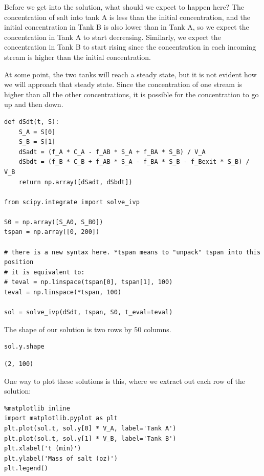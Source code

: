 \documentclass[11pt]{article}
\begin{document}
Before we get into the solution, what should we expect to happen here? The concentration of salt into tank A is less than the initial concentration, and the initial concentration in Tank B is also lower than in Tank A, so we expect the concentration in Tank A to start decreasing. Similarly, we expect the concentration in Tank B to start rising since the concentration in each incoming stream is higher than the initial concentration.

At some point, the two tanks will reach a steady state, but it is not evident how we will approach that steady state. Since the concentration of one stream is higher than all the other concentrations, it is possible for the concentration to go up and then down.

\begin{verbatim}
def dSdt(t, S):
    S_A = S[0]
    S_B = S[1]
    dSadt = (f_A * C_A - f_AB * S_A + f_BA * S_B) / V_A
    dSbdt = (f_B * C_B + f_AB * S_A - f_BA * S_B - f_Bexit * S_B) / V_B
    return np.array([dSadt, dSbdt])

from scipy.integrate import solve_ivp

S0 = np.array([S_A0, S_B0])
tspan = np.array([0, 200])

# there is a new syntax here. *tspan means to "unpack" tspan into this position
# it is equivalent to:
# teval = np.linspace(tspan[0], tspan[1], 100)
teval = np.linspace(*tspan, 100)

sol = solve_ivp(dSdt, tspan, S0, t_eval=teval)
\end{verbatim}

The shape of our solution is two rows by 50 columns.

\begin{verbatim}
sol.y.shape
\end{verbatim}

\begin{verbatim}
(2, 100)
\end{verbatim}


One way to plot these solutions is this, where we extract out each row of the solution:

\begin{verbatim}
%matplotlib inline
import matplotlib.pyplot as plt
plt.plot(sol.t, sol.y[0] * V_A, label='Tank A')
plt.plot(sol.t, sol.y[1] * V_B, label='Tank B')
plt.xlabel('t (min)')
plt.ylabel('Mass of salt (oz)')
plt.legend()
\end{verbatim}
\end{document}
